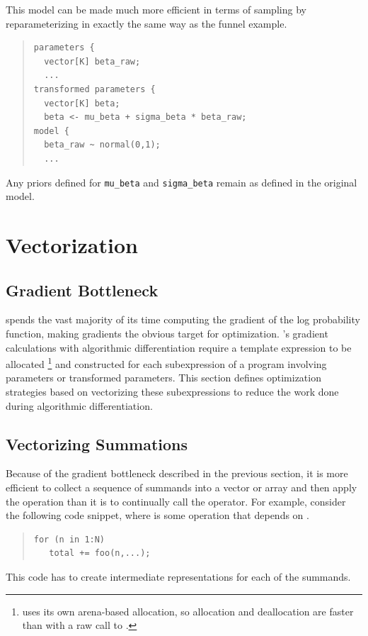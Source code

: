 This model can be made much more efficient in terms of sampling by
reparameterizing in exactly the same way as the funnel example.
%
\begin{quote}
\begin{Verbatim}
parameters {
  vector[K] beta_raw;
  ...
transformed parameters {
  vector[K] beta;
  beta <- mu_beta + sigma_beta * beta_raw;
model {
  beta_raw ~ normal(0,1);
  ...
\end{Verbatim}
\end{quote}
%
Any priors defined for \Verb|mu_beta| and \Verb|sigma_beta| remain as
defined in the original model.



\section{Vectorization}

\subsection{Gradient Bottleneck}

\Stan spends the vast majority of its time computing the gradient of
the log probability function, making gradients the obvious target for
optimization.  \Stan's gradient calculations with algorithmic
differentiation require a template expression to be allocated%
%
\footnote{\Stan uses its own arena-based allocation, so allocation and
  deallocation are faster than with a raw call to .}
%
and constructed for each subexpression of a \Stan program involving
parameters or transformed parameters.  This section defines
optimization strategies based on vectorizing these subexpressions to
reduce the work done during algorithmic differentiation.

\subsection{Vectorizing Summations}

Because of the gradient bottleneck described in the previous section,
it is more efficient to collect a sequence of summands into a vector
or array and then apply the  operation than it is to
continually call the \code{+=} operator.  For example, consider the
following code snippet, where  is some operation that
depends on .
%
\begin{quote}
\begin{Verbatim}
for (n in 1:N) 
   total += foo(n,...);
\end{Verbatim}
\end{quote}
%
This code has to create intermediate representations for each
of the  summands.  

